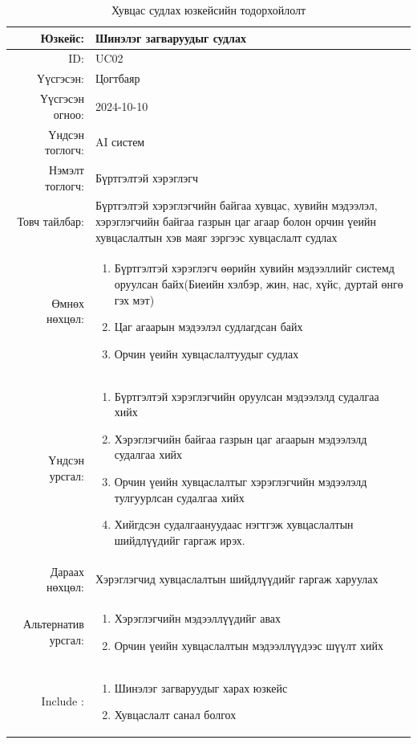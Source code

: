 \newpage
\begin{longtable}{|r|p{11.5cm}|}
    \caption{Хувцас судлах юзкейсийн тодорхойлолт} 
    \label{table:songolt2}\\ \hline
    {Юзкейс:} & {Шинэлэг загваруудыг судлах}\\ \hline
    {ID:} & {UC02}\\ \hline
    {Үүсгэсэн:} & {Цогтбаяр}\\ \hline
    {Үүсгэсэн огноо:} & {2024-10-10}\\ \hline
    {Үндсэн тоглогч:} & {AI систем}\\ \hline
    {Нэмэлт тоглогч:} & {Бүртгэлтэй хэрэглэгч}\\ \hline
    {Товч тайлбар:} & {Бүртгэлтэй хэрэглэгчийн байгаа хувцас, хувийн мэдээлэл, хэрэглэгчийн байгаа газрын цаг агаар болон орчин үеийн хувцаслалтын хэв маяг зэргээс хувцаслалт судлах}\\ \hline
    {Өмнөх нөхцөл:} & {\begin{enumerate}
        \item Бүртгэлтэй хэрэглэгч өөрийн хувийн мэдээллийг системд оруулсан байх(Биеийн хэлбэр, жин, нас, хүйс, дуртай өнгө гэх мэт)
        \item Цаг агаарын мэдээлэл судлагдсан байх
        \item Орчин үеийн хувцаслалтуудыг судлах
    \end{enumerate}}\\ \hline
    {Үндсэн урсгал:} & {\begin{enumerate}    
        \item Бүртгэлтэй хэрэглэгчийн оруулсан мэдээлэлд судалгаа хийх
    \item Хэрэглэгчийн байгаа газрын цаг агаарын мэдээлэлд судалгаа хийх
    \item Орчин үеийн хувцаслалтыг хэрэглэгчийн мэдээлэлд тулгуурлсан судалгаа хийх
    \item Хийгдсэн судалгаануудаас нэгтгэж хувцаслалтын шийдлүүдийг гаргаж ирэх.\end{enumerate}}\\ \hline
    {Дараах нөхцөл:} & {Хэрэглэгчид хувцаслалтын шийдлүүдийг гаргаж харуулах}\\ \hline
    {Альтернатив урсгал:} & {\begin{enumerate}
        \item Хэрэглэгчийн мэдээллүүдийг авах
        \item Орчин үеийн хувцаслалтын мэдээллүүдээс шүүлт хийх
    \end{enumerate}}\\ \hline
    {Include :} & {\begin{enumerate}
        \item Шинэлэг загваруудыг харах юзкейс
        \item Хувцаслалт санал болгох
    \end{enumerate}}\\ \hline
\end{longtable}

